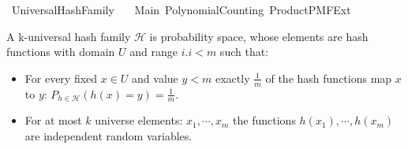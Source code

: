 %
\begin{isabellebody}%
%
%
\isadelimdocument
%
\endisadelimdocument
%
\isatagdocument
%
\isamarkuptrue%
%
\endisatagdocument
{\isafolddocument}%
%
\isadelimdocument
%
\endisadelimdocument
%
\isadelimtheory
%
\endisadelimtheory
%
\isatagtheory
{}\isamarkupfalse%
\ UniversalHashFamily\isanewline
\ \ \ Main\ PolynomialCounting\ Product{\isacharunderscore}{\kern0pt}PMF{\isacharunderscore}{\kern0pt}Ext\isanewline
{}%
\endisatagtheory
{\isafoldtheory}%
%
\isadelimtheory
%
\endisadelimtheory
%
\begin{isamarkuptext}%
A k-universal hash family $\mathcal H$ is probability space, whose elements are hash functions 
with domain $U$ and range ${i. i < m}$ such that:

\begin{itemize}
\item For every fixed $x \in U$ and value $y < m$ exactly $\frac{1}{m}$ of the hash functions map
  $x$ to $y$: $P_{h \in \mathcal H} \left(h(x) = y\right) = \frac{1}{m}$.
\item For at most $k$ universe elements: $x_1,\cdots,x_m$ the functions $h(x_1), \cdots, h(x_m)$ 
  are independent random variables.
\end{itemize}


\end{isamarkuptext}
\end{isabellebody}
